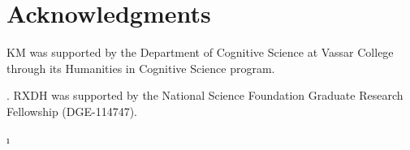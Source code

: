 \documentclass[10pt,letterpaper]{article}
\newcommand{\jefan}[1]{{\color{blue}{[jefan: #1]}}}
\begin{document}
\section{Acknowledgments}

KM was supported by the Department of Cognitive Science at Vassar College through its Humanities in Cognitive Science program.

 \jefan{add any funding sources here; if none to report, leave blank}. RXDH was supported by the National Science Foundation Graduate Research Fellowship (DGE-114747). 




\setlength{\bibleftmargin}{.125in}
\setlength{\bibindent}{-\bibleftmargin}ı
\end{document}
